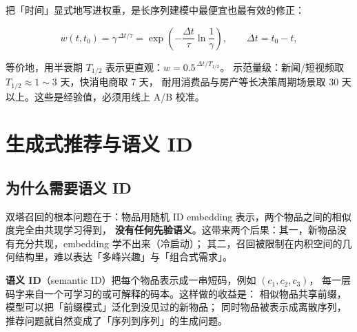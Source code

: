 \begin{formulacard}[行为序列的时间衰减权重]
把「时间」显式地写进权重，是长序列建模中最便宜也最有效的修正：

\begin{equation}
w(t, t_0) = \gamma^{\, \Delta t / \tau} = \exp\!\left( - \frac{\Delta t}{\tau} \ln \frac{1}{\gamma} \right),
\qquad \Delta t = t_0 - t ,
\label{eq:time-decay}
\end{equation}

等价地，用半衰期 $T_{1/2}$ 表示更直观：$w = 0.5^{\, \Delta t / T_{1/2}}$。
示范量级：新闻/短视频取 $T_{1/2} \approx 1 \sim 3$ 天，快消电商取 7 天，
耐用消费品与房产等长决策周期场景取 30 天以上。这些是经验值，必须用线上 A/B 校准。
\end{formulacard}

\section{生成式推荐与语义 ID}

\subsection{为什么需要语义 ID}

双塔召回的根本问题在于：物品用随机 ID embedding 表示，两个物品之间的相似度完全由共现学习得到，
\textbf{没有任何先验语义}。这带来两个后果：其一，新物品没有充分共现，embedding 学不出来（冷启动）；
其二，召回被限制在内积空间的几何结构里，难以表达「多峰兴趣」与「组合式需求」。

\textbf{语义 ID}（semantic ID）把每个物品表示成一串短码，例如 $(c_1, c_2, c_3)$，
每一层码字来自一个可学习的或可解释的码本。这样做的收益是：
相似物品共享前缀，模型可以把「前缀模式」泛化到没见过的新物品；
同时物品被表示成离散序列，推荐问题就自然变成了「序列到序列」的生成问题。

